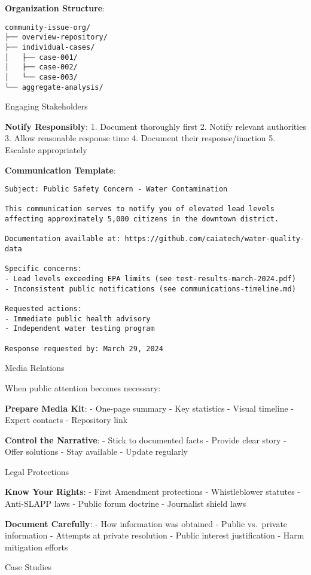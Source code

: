 \textbf{Organization Structure}:

\begin{verbatim}
community-issue-org/
├── overview-repository/
├── individual-cases/
│   ├── case-001/
│   ├── case-002/
│   └── case-003/
└── aggregate-analysis/
\end{verbatim}

Engaging Stakeholders

\textbf{Notify Responsibly}: 1. Document thoroughly first 2. Notify
relevant authorities 3. Allow reasonable response time 4. Document their
response/inaction 5. Escalate appropriately

\textbf{Communication Template}:

\begin{verbatim}
Subject: Public Safety Concern - Water Contamination

This communication serves to notify you of elevated lead levels 
affecting approximately 5,000 citizens in the downtown district.

Documentation available at: https://github.com/caiatech/water-quality-data

Specific concerns:
- Lead levels exceeding EPA limits (see test-results-march-2024.pdf)
- Inconsistent public notifications (see communications-timeline.md)

Requested actions:
- Immediate public health advisory
- Independent water testing program

Response requested by: March 29, 2024
\end{verbatim}

Media Relations

When public attention becomes necessary:

\textbf{Prepare Media Kit}: - One-page summary - Key statistics - Visual
timeline - Expert contacts - Repository link

\textbf{Control the Narrative}: - Stick to documented facts - Provide
clear story - Offer solutions - Stay available - Update regularly

Legal Protections

\textbf{Know Your Rights}: - First Amendment protections - Whistleblower
statutes - Anti-SLAPP laws - Public forum doctrine - Journalist shield
laws

\textbf{Document Carefully}: - How information was obtained - Public
vs.~private information - Attempts at private resolution - Public
interest justification - Harm mitigation efforts

Case Studies

